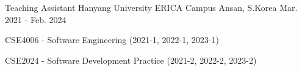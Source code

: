 
\begin{cventries}
\cventry
{Teaching Assistant} %
{Hanyang University ERICA Campus} %
{Ansan, S.Korea} %
{Mar. 2021 - Feb. 2024} %
{
  \begin{cvitems} %
    \item {CSE4006 - Software Engineering (2021-1, 2022-1, 2023-1)}
    \item {CSE2024 - Software Development Practice (2021-2, 2022-2, 2023-2)}
  \end{cvitems}
}
\end{cventries}